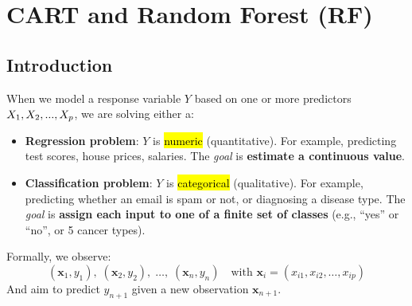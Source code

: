 \section{CART and Random Forest (RF)}

\subsection{Introduction}

When we model a response variable $Y$ based on one or more predictors $X_1, X_2,\break ..., X_p$, we are solving either a:
\begin{itemize}
    \item \textbf{Regression problem}: $Y$ is \hl{numeric} (quantitative). For example, predicting test scores, house prices, salaries. The \emph{goal} is \textbf{estimate a continuous value}.
    \item \textbf{Classification problem}: $Y$ is \hl{categorical} (qualitative). For example, predicting whether an email is spam or not, or diagnosing a disease type. The \emph{goal} is \textbf{assign each input to one of a finite set of classes} (e.g., ``yes'' or ``no'', or 5 cancer types).
\end{itemize}
Formally, we observe:
\begin{equation*}
    \left(\mathbf{x}_1, y_1\right), \; \left(\mathbf{x}_2, y_2\right), \; \dots, \; \left(\mathbf{x}_n, y_n\right)
    \quad
    \text{with } \mathbf{x}_i = \left(x_{i1}, x_{i2}, \dots, x_{ip}\right)
\end{equation*}
And aim to predict $y_{n+1}$ given a new observation $\mathbf{x}_{n+1}$.

